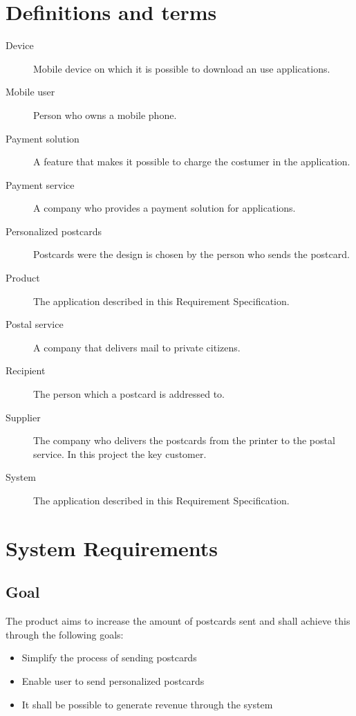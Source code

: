 \documentclass[10pt,a4paper]{article}
\begin{document}
\section{Definitions and terms}
\begin{description}
\item[Device] Mobile device on which it is possible to download an use applications.

\item[Mobile user] Person who owns a mobile phone. 
\item[Payment solution] A feature that makes it possible to charge the costumer in the application. 
\item[Payment service] A company who provides a payment solution for applications. 
\item[Personalized postcards] Postcards were the design is chosen by the person who sends the postcard. 
\item[Product]The application described in this Requirement Specification.
\item[Postal service] A company that delivers mail to private citizens.
\item[Recipient]The person which a postcard is addressed to.
\item[Supplier] The company who delivers the postcards from the printer to the postal service. In this project the key customer.

\item[System] The application described in this Requirement Specification.
 

\end{description}

\section{System Requirements}



\subsection{Goal}
The product aims to increase the amount of postcards sent and shall achieve this through the following goals:

\begin{itemize}
\item Simplify the process of sending postcards
\item Enable user to send personalized postcards
\item It shall be possible to generate revenue through the system
\end{itemize}
\end{document}
